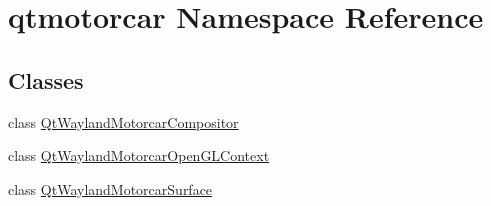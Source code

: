 \hypertarget{namespaceqtmotorcar}{\section{qtmotorcar Namespace Reference}
\label{namespaceqtmotorcar}
}
\subsection*{Classes}
\begin{DoxyCompactItemize}
\item 
class \hyperlink{classqtmotorcar_1_1QtWaylandMotorcarCompositor}{Qt\-Wayland\-Motorcar\-Compositor}
\item 
class \hyperlink{classqtmotorcar_1_1QtWaylandMotorcarOpenGLContext}{Qt\-Wayland\-Motorcar\-Open\-G\-L\-Context}
\item 
class \hyperlink{classqtmotorcar_1_1QtWaylandMotorcarSurface}{Qt\-Wayland\-Motorcar\-Surface}
\end{DoxyCompactItemize}
